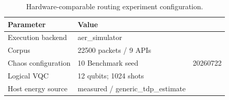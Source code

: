\begin{table}[htbp]
\caption{Hardware-comparable routing experiment configuration.}
\label{tab:routing-experiment-configuration}
\centering
\begin{tabular}{ll}
\hline
Parameter & Value \\
\hline
Execution backend & aer\_simulator \\
Corpus & 22500 packets / 9 APIs \\
Chaos configuration & 10%
Benchmark seed & 20260722 \\
Logical VQC & 12 qubits; 1024 shots \\
Host energy source & measured / generic\_tdp\_estimate \\
\hline
\end{tabular}
\end{table}
